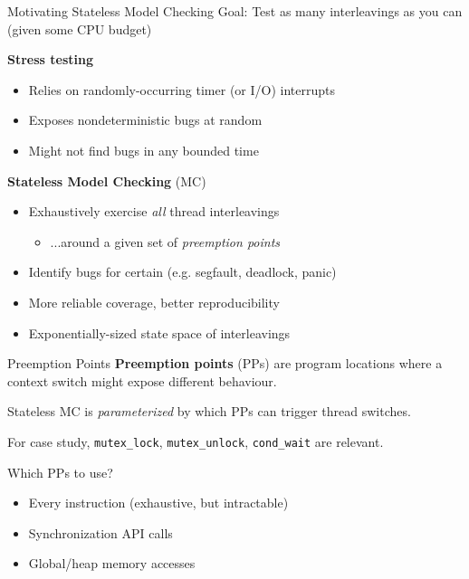 \documentclass[xcolor=dvipsnames]{beamer}
\begin{document}
\begin{frame}{Motivating Stateless Model Checking}
	Goal: Test as many interleavings as you can (given some CPU budget)
	\linegap

	\textbf{Stress testing}
	\begin{itemize}
		\item Relies on randomly-occurring timer (or I/O) interrupts
		\item Exposes nondeterministic bugs at random
		\item Might not find bugs in any bounded time
	\end{itemize}
	\linegap

	\textbf{Stateless Model Checking} (MC)
	\begin{itemize}
		\item Exhaustively exercise {\em all} thread interleavings
		\begin{itemize}
			\item ...around a given set of {\em preemption points}
		\end{itemize}
		\item Identify bugs for certain (e.g. segfault, deadlock, panic)
		\item More reliable coverage, better reproducibility
		\item Exponentially-sized state space of interleavings
	\end{itemize}
\end{frame}

\begin{frame}{Preemption Points}
	\textbf{Preemption points} (PPs) are program locations where a context switch might expose different behaviour.
	\linegap

	Stateless MC is {\em parameterized} by which PPs can trigger thread switches.
	\linegap

	For case study, {\tt mutex\_lock}, {\tt mutex\_unlock}, {\tt cond\_wait} are relevant.
	\pause
	\linegap

	Which PPs to use?
	\begin{itemize}
		\item Every instruction (exhaustive, but intractable)
		\item Synchronization API calls
		\item Global/heap memory accesses
	\end{itemize}
\end{frame}
\end{document}
